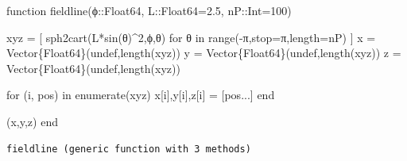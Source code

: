 \documentclass[
  a4paper,
  DIV=11]{scrreprt}
\newenvironment{Shaded}{\begin{snugshade}}{\end{snugshade}}
\newcommand{\ConstantTok}[1]{\textcolor[rgb]{0.56,0.35,0.01}{#1}}
\newcommand{\ControlFlowTok}[1]{\textcolor[rgb]{0.00,0.23,0.31}{#1}}
\newcommand{\DataTypeTok}[1]{\textcolor[rgb]{0.68,0.00,0.00}{#1}}
\newcommand{\FloatTok}[1]{\textcolor[rgb]{0.68,0.00,0.00}{#1}}
\newcommand{\FunctionTok}[1]{\textcolor[rgb]{0.28,0.35,0.67}{#1}}
\newcommand{\KeywordTok}[1]{\textcolor[rgb]{0.00,0.23,0.31}{#1}}
\newcommand{\NormalTok}[1]{\textcolor[rgb]{0.00,0.23,0.31}{#1}}
\newcommand{\OperatorTok}[1]{\textcolor[rgb]{0.37,0.37,0.37}{#1}}
\begin{document}
\begin{Shaded}
\begin{Highlighting}[]
\KeywordTok{function} \FunctionTok{fieldline}\NormalTok{(ϕ}\OperatorTok{::}\DataTypeTok{Float64}\NormalTok{, L}\OperatorTok{::}\DataTypeTok{Float64}\NormalTok{=}\FloatTok{2.5}\NormalTok{, nP}\OperatorTok{::}\DataTypeTok{Int}\NormalTok{=}\FloatTok{100}\NormalTok{)}

\NormalTok{   xyz }\OperatorTok{=}\NormalTok{ [ }\FunctionTok{sph2cart}\NormalTok{(}\FunctionTok{L*sin}\NormalTok{(θ)}\OperatorTok{\^{}}\FloatTok{2}\NormalTok{,ϕ,θ) for θ }\KeywordTok{in} \FunctionTok{range}\NormalTok{(}\OperatorTok{{-}}\ConstantTok{π}\NormalTok{,stop}\OperatorTok{=}\ConstantTok{π}\NormalTok{,length}\OperatorTok{=}\NormalTok{nP) ]}
\NormalTok{   x }\OperatorTok{=} \FunctionTok{Vector}\DataTypeTok{\{Float64\}}\NormalTok{(}\ConstantTok{undef}\NormalTok{,}\FunctionTok{length}\NormalTok{(xyz))}
\NormalTok{   y }\OperatorTok{=} \FunctionTok{Vector}\DataTypeTok{\{Float64\}}\NormalTok{(}\ConstantTok{undef}\NormalTok{,}\FunctionTok{length}\NormalTok{(xyz))}
\NormalTok{   z }\OperatorTok{=} \FunctionTok{Vector}\DataTypeTok{\{Float64\}}\NormalTok{(}\ConstantTok{undef}\NormalTok{,}\FunctionTok{length}\NormalTok{(xyz))}

   \ControlFlowTok{for}\NormalTok{ (i, pos) }\KeywordTok{in} \FunctionTok{enumerate}\NormalTok{(xyz)}
\NormalTok{      x[i],y[i],z[i] }\OperatorTok{=}\NormalTok{ [pos}\OperatorTok{...}\NormalTok{]}
   \ControlFlowTok{end}

\NormalTok{   (x,y,z)}
\KeywordTok{end}
\end{Highlighting}
\end{Shaded}

\begin{verbatim}
fieldline (generic function with 3 methods)
\end{verbatim}
\end{document}
